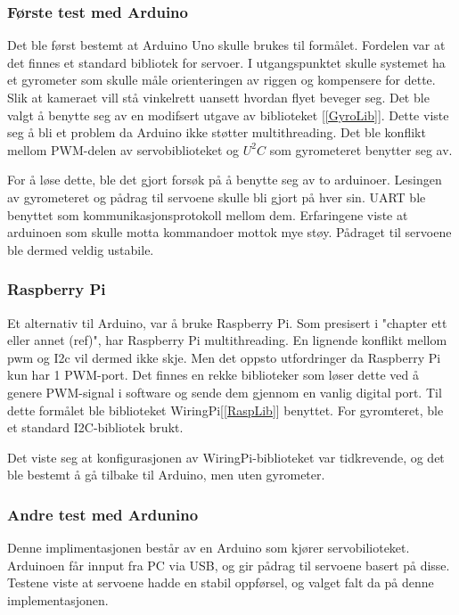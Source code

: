 \subsubsection{Første test med Arduino}
Det ble først bestemt at Arduino Uno skulle brukes til formålet. Fordelen var at det finnes et standard bibliotek for servoer. I utgangspunktet skulle systemet ha et gyrometer som skulle måle orienteringen av riggen og kompensere for dette. Slik at kameraet vill stå vinkelrett uansett hvordan flyet beveger seg. Det ble valgt å benytte seg av en modifsert utgave av biblioteket [\ref{GyroLib}]. Dette viste seg å bli et problem da Arduino ikke støtter multithreading. Det ble konflikt mellom PWM-delen av servobiblioteket og $U^2C$ som gyrometeret benytter seg av.

For å løse dette, ble det gjort forsøk på å benytte seg av to arduinoer. Lesingen av gyrometeret og pådrag til servoene skulle bli gjort på hver sin. UART ble benyttet som kommunikasjonsprotokoll mellom dem. Erfaringene viste at arduinoen som skulle motta kommandoer mottok mye støy. Pådraget til servoene ble dermed veldig ustabile. 

\subsubsection{Raspberry Pi}
Et alternativ til Arduino, var å bruke Raspberry Pi. Som presisert i "chapter ett eller annet (ref)", har Raspberry Pi multithreading. En lignende konflikt mellom pwm og I2c vil dermed ikke skje. Men det oppsto utfordringer da Raspberry Pi kun har 1 PWM-port. Det finnes en rekke biblioteker som løser dette ved å genere PWM-signal i software og sende dem gjennom en vanlig digital port. Til dette formålet ble biblioteket WiringPi[\ref{RaspLib}] benyttet. For gyromteret, ble et standard I2C-bibliotek brukt. 

Det viste seg at konfigurasjonen av WiringPi-biblioteket var tidkrevende, og det ble bestemt å gå tilbake til Arduino, men uten gyrometer.  

\subsubsection{Andre test med Ardunino}
Denne implimentasjonen består av en Arduino som kjører servobilioteket. Arduinoen får innput fra PC via USB, og gir pådrag til servoene basert på disse. Testene viste at servoene hadde en stabil oppførsel, og valget falt da på denne implementasjonen.   

